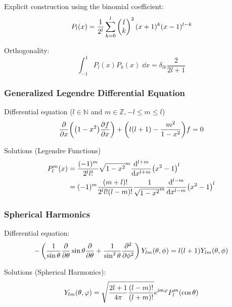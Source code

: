 			\noindent
			Explicit construction using the binomial coefficient:
			\begin{equation}
				P_l(x)=\frac{1}{2^l} \sum_{k=0}^{l}\left(\begin{matrix}l\\k\end{matrix}\right)^2(x+1)^k(x-1)^{l-k}
			\end{equation}

			\noindent
			Orthogonality:
			\begin{equation}
				\int_{-1}^1 P_l(x) P_k(x)\;\dd x = \delta_{lk} \frac{2}{2l+1}
			\end{equation}

		\subsubsection{Generalized Legendre Differential Equation}
			\noindent
			Differential equation ($l\in\mathbb{N}$ and $m\in\mathbb{Z}, -l\le m\le l$)
			\begin{equation}
				\pdv{x}\qty(\qty(1-x^2)\pdv{f}{x})+\qty(l\qty(l+1)-\frac{m^2}{1-x^2})f= 0
			\end{equation}

			\noindent
			Solutions (Legendre Functions)
			\begin{equation}
				\begin{aligned}
					P_l^m(x) &= \frac{(-1)^m}{2^l l!}\sqrt{1-x^2}^m
					\dv[l+m]{x}\qty(x^2-1)^l \\
					&= (-1)^m \frac{(m+l)!}{2^l l! (l-m)!}\frac{1}{\sqrt{1-x^2}^m}
					\dv[l-m]{x}\qty(x^2-1)^l \\
				\end{aligned}
			\end{equation}

		\subsubsection{Spherical Harmonics}
			\noindent
			Differential equation:
			\begin{equation}
				-\left(
				\frac{1}{\sin\theta}\pdv{\theta}\sin\theta\pdv{\theta} + \frac{1}{\sin^2\theta}\frac{\partial^2}{\partial \phi^2}
				\right)
				Y_{lm}(\theta,\phi) = l(l+1)Y_{lm}(\theta,\phi)
			\end{equation}

			\noindent
			Solutions (Spherical Harmonics):
			\begin{equation} \label{Eq:SphericalHarmonics}
				Y_{lm}(\theta,\varphi) = \sqrt{\frac{2l+1}{4\pi}\frac{(l-m)!}{(l+m)!}} e^{\mathrm{i} m\varphi} P_l^m(\cos\theta)
			\end{equation}

